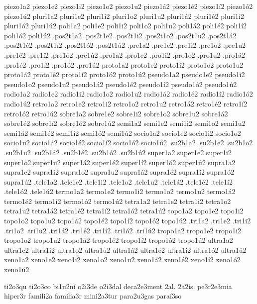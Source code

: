 {{piezo1a2 piezo1e2 piezo1i2 piezo1o2 piezo1u2 piezo1^^e12 piezo1^^e92 piezo1^^ed2 piezo1^^f32 piezo1^^fa2 
pluri1a2 pluri1e2 pluri1i2 pluri1o2 pluri1u2 pluri1^^e12 pluri1^^e92 pluri1^^ed2 pluri1^^f32 pluri1^^fa2 
poli1a2 poli1e2 poli1i2 poli1o2 poli1u2 poli1^^e12 poli1^^e92 poli1^^ed2 poli1^^f32 poli1^^fa2 
.pos2t1a2 .pos2t1e2 .pos2t1i2 .pos2t1o2 .pos2t1u2 .pos2t1^^e12 .pos2t1^^e92 .pos2t1^^ed2 .pos2t1^^f32 .pos2t1^^fa2 
.pre1a2 .pre1e2 .pre1i2 .pre1o2 .pre1u2         .pre1^^e92 .pre1^^ed2 .pre1^^f32 .pre1^^fa2 
.pro1a2 .pro1e2 .pro1i2 .pro1o2 .pro1u2 .pro1^^e12 .pro1^^e92 .pro1^^ed2 .pro1^^f32 .pro1^^fa2 
proto1a2 proto1e2 proto1i2 proto1o2 proto1u2 proto1^^e12 proto1^^e92 proto1^^ed2 proto1^^f32 proto1^^fa2 
pseudo1a2 pseudo1e2 pseudo1i2 pseudo1o2 pseudo1u2 pseudo1^^e12 pseudo1^^e92 pseudo1^^ed2 pseudo1^^f32 pseudo1^^fa2 
radio1a2 radio1e2 radio1i2 radio1o2 radio1u2 radio1^^e12 radio1^^e92 radio1^^ed2 radio1^^f32 radio1^^fa2 
retro1a2 retro1e2 retro1i2 retro1o2 retro1u2 retro1^^e12 retro1^^e92 retro1^^ed2 retro1^^f32 retro1^^fa2 
sobre1a2 sobre1e2 sobre1i2 sobre1o2 sobre1u2 sobre1^^e12 sobre1^^e92 sobre1^^ed2 sobre1^^f32 sobre1^^fa2 
semi1a2 semi1e2 semi1i2 semi1o2 semi1u2 semi1^^e12 semi1^^e92 semi1^^ed2 semi1^^f32 semi1^^fa2 
socio1a2 socio1e2 socio1i2 socio1o2 socio1u2 socio1^^e12 socio1^^e92 socio1^^ed2 socio1^^f32 socio1^^fa2 
.su2b1a2 .su2b1e2          .su2b1o2 .su2b1u2 .su2b1^^e12 .su2b1^^e92          .su2b1^^f32 .su2b1^^fa2 
super1a2 super1e2 super1i2 super1o2 super1u2 super1^^e12 super1^^e92 super1^^ed2 super1^^f32 super1^^fa2 
supra1a2 supra1e2 supra1i2 supra1o2 supra1u2 supra1^^e12 supra1^^e92 supra1^^ed2 supra1^^f32 supra1^^fa2 
.tele1a2 .tele1e2 .tele1i2 .tele1o2 .tele1u2 .tele1^^e12 .tele1^^e92 .tele1^^ed2 .tele1^^f32 .tele1^^fa2 
termo1a2 termo1e2 termo1i2 termo1o2 termo1u2 termo1^^e12 termo1^^e92 termo1^^ed2 termo1^^f32 termo1^^fa2 
tetra1a2 tetra1e2 tetra1i2 tetra1o2 tetra1u2 tetra1^^e12 tetra1^^e92 tetra1^^ed2 tetra1^^f32 tetra1^^fa2 
topo1a2 topo1e2 topo1i2 topo1o2 topo1u2 topo1^^e12 topo1^^e92 topo1^^ed2 topo1^^f32 topo1^^fa2 
.tri1a2 .tri1e2 .tri1i2 .tri1o2 .tri1u2 .tri1^^e12 .tri1^^e92 .tri1^^ed2 .tri1^^f32 .tri1^^fa2 
tropo1a2 tropo1e2 tropo1i2 tropo1o2 tropo1u2 tropo1^^e12 tropo1^^e92 tropo1^^ed2 tropo1^^f32 tropo1^^fa2 
ultra1a2 ultra1e2 ultra1i2 ultra1o2 ultra1u2 ultra1^^e12 ultra1^^e92 ultra1^^ed2 ultra1^^f32 ultra1^^fa2 
xeno1a2 xeno1e2 xeno1i2 xeno1o2 xeno1u2 xeno1^^e12 xeno1^^e92 xeno1^^ed2 xeno1^^f32 xeno1^^fa2 

ti2o3qu ti2o3co bi1u2n^^ed o2i3de o2i3dal deca2e3ment 2al. 2a2is. pe3r2e3mia hiper3r 
famili2a familia3r mini2a3tur para2u3gas para^^ed3so 

}}
